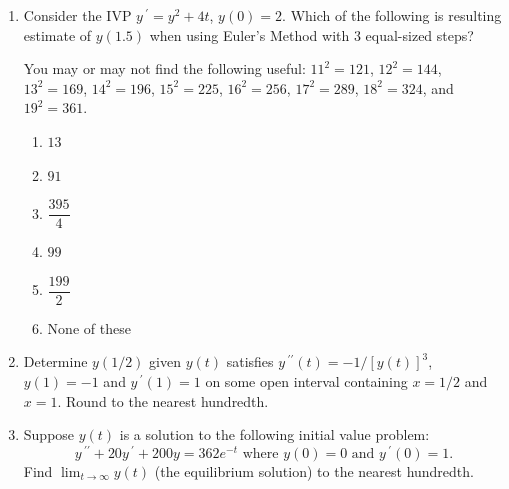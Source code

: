 \documentclass{ximera}
\begin{document}
\begin{enumerate}[label=(\arabic*)]
\newpage

\item   Consider the IVP $y\,^{\prime}=y^2+4t$, $y(0)=2$.  Which of the following is resulting estimate of $y(1.5)$ when using Euler's Method with $3$ equal-sized steps? 

    You may or may not find the following useful:  $11^2=121$, $12^2=144$, $13^2=169$,  $14^2=196$, $15^2=225$, $16^2=256$, $17^2=289$, $18^2=324$, and $19^2=361$.





\begin{enumerate}[label=(\alph*)]
		\item[$\bigcirc$ (a)] $13$
		\item[$\bigcirc$ (b)] $91$
		\item[$\bigcirc$ (c)] $\dfrac{395}{4}$
		\item[$\bigcirc$ (d)] $99$
		\item[$\bigcirc$ (e)] $\dfrac{199}{2}$  %
	\item[$\bigcirc$ (f)] None of these
	\end{enumerate} 



\item  Determine $y(1/2)$ given $y(t)$ satisfies $y\,^{\prime\prime}(t)=-1/[y(t)]^3$, $y(1)=-1$ and $y\,^{\prime}(1)=1$ on some open interval containing $x=1/2$ and $x=1$.  Round to the nearest hundredth.






\item Suppose $y(t)$ is a solution to the following initial value problem: $$ y\,^{\prime\prime} + 20y\,^{\prime}+200y = 362e^{-t}\mbox{ where }y(0) = 0\mbox{ and }y\,^{\prime}(0) = 1.$$  Find $\displaystyle \lim_{t \rightarrow \infty} y(t)$ (the equilibrium solution) to the nearest hundredth.




\end{enumerate}
\end{document}
